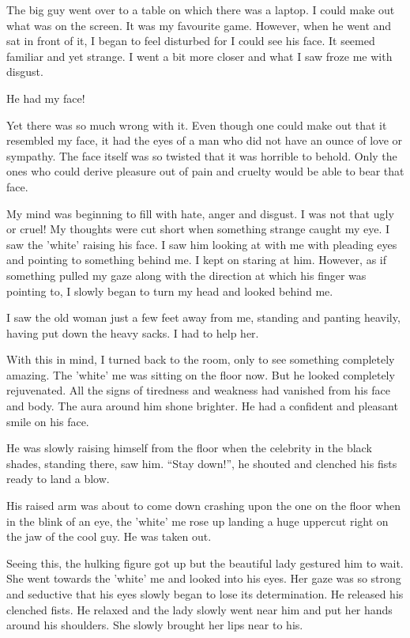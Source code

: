 \documentclass[twoside,11pt]{article}
\begin{document}
The big guy went over to a table on which there was a laptop. I could make out what was on the screen. It was my favourite game. However, when he went and sat in front of it, I began to feel disturbed for I could see his face. It seemed familiar and yet strange. I went a bit more closer and what I saw froze me with disgust.

He had my face!

Yet there was so much wrong with it. Even though one could make out that it resembled my face, it had the eyes of a man who did not have an ounce of love or sympathy. The face itself was so twisted that it was horrible to behold. Only the ones who could derive pleasure out of pain and cruelty would be able to bear that face.

My mind was beginning to fill with hate, anger and disgust. I was not that ugly or cruel! My thoughts were cut short when something strange caught my eye. I saw the 'white' raising his face. I saw him looking at with me with pleading eyes and pointing to something behind me. I kept on staring at him. However, as if something pulled my gaze along with the direction at which his finger was pointing to, I slowly began to turn my head and looked behind me.

I saw the old woman just a few feet away from me, standing and panting heavily, having put down the heavy sacks. I had to help her.

With this in mind, I turned back to the room, only to see something completely amazing. The 'white' me was sitting on the floor now. But he looked completely rejuvenated. All the signs of tiredness and weakness had vanished from his face and body. The aura around him shone brighter. He had a confident and pleasant smile on his face.

He was slowly raising himself from the floor when the celebrity in the black shades, standing there, saw him. ``Stay down!'', he shouted and clenched his fists ready to land a blow.

His raised arm was about to come down crashing upon the one on the floor when in the blink of an eye, the 'white' me rose up landing a huge uppercut right on the jaw of the cool guy. He was taken out.

Seeing this, the hulking figure got up but the beautiful lady gestured him to wait. She went towards the 'white' me and looked into his eyes. Her gaze was so strong and seductive that his eyes slowly began to lose its determination. He released his clenched fists. He relaxed and the lady slowly went near him and put her hands around his shoulders. She slowly brought her lips near to his.
\end{document}

